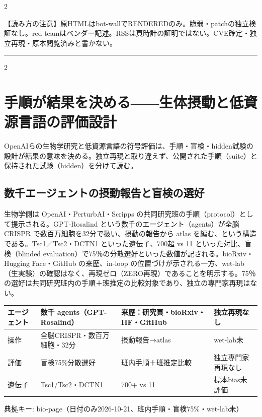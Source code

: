 \documentclass[lualatex,a4paper,10pt]{jlreq}
\begin{document}
\begin{multicols}{2} %


\begin{tcolorbox}[colback=SurveySoft,colframe=SurveyRule,arc=1mm,boxrule=0.4pt,left=2mm,right=2mm]
【読み方の注意】原HTMLはbot-wallでRENDEREDのみ。脆弱・patchの独立検証なし。red-teamはベンダー記述。RSSは頁時計の証明ではない。CVE確定・独立再現・原本閲覧済みと書かない。

\end{tcolorbox}


\end{multicols} %
\bigskip\hrule\bigskip %
\begin{multicols}{2} %


\section{手順が結果を決める――生体摂動と低資源言語の評価設計}
\label{sec:P7}


OpenAIらの生物学研究と低資源言語の符号評価は、手順・盲検・hidden試験の設計が結果の意味を決める。独立再現と取り違えず、公開された手順（suite）と保持された試験（hidden）を分けて読む。


\subsection*{数千エージェントの摂動報告と盲検の選好}


生物学側は OpenAI・PerturbAI・Scripps の共同研究班の手順（protocol）として提示される。GPT-Rosalind という数千のエージェント（agents）が全脳 CRISPR で数百万細胞を32分で扱い、摂動の報告から atlas を編む、という構造である。Tsc1／Tsc2・DCTN1 といった遺伝子、700超 vs 11 といった対比、盲検（blinded evaluation）で75％の分散選好といった数値が記される。bioRxiv・Hugging Face・GitHub の来歴、in-loop の位置づけが示される一方、wet-lab（生実験）の確認はなく、再現ゼロ（ZERO再現）であることを明示する。75％の選好は共同研究班内の手順＋班推定の比較対象であり、独立の専門家再現はない。


\end{multicols} %
{\centering\footnotesize
{}
\begin{tabularx}{0.96\linewidth}{@{}lXXX@{}}
\toprule
エージェント & 数千 agents（GPT-Rosalind） & 来歴：研究頁・bioRxiv・HF・GitHub & 独立再現なし \\
\midrule
操作 & 全脳CRISPR・数百万細胞・32分 & 摂動報告→atlas & wet-lab未 \\
評価 & 盲検75\%分散選好 & 班内手順＋班推定比較 & 独立専門家再現なし \\
遺伝子 & Tsc1/Tsc2・DCTN1 & 700+ vs 11 & 標本bias未評価 \\
\bottomrule
\end{tabularx}
{\scriptsize\color{SurveyMuted} 典拠キー: bio-page（日付のみ2026-10-21、班内手順・盲検75\%・wet-lab未）\par}
} %
\end{document}
